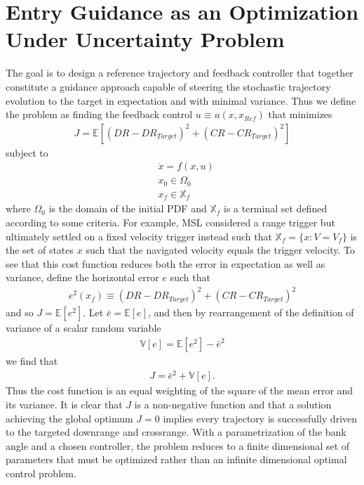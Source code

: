 \documentclass[10pt,a4paper]{article}
\begin{document}
	\section{Entry Guidance as an Optimization Under Uncertainty Problem}
	The goal is to design a reference trajectory and feedback controller that together constitute a guidance approach capable of steering the stochastic trajectory evolution to the target in expectation and with minimal variance. Thus we define the problem as finding the feedback control $u\equiv u(x,x_{Ref})$ that minimizes
	\begin{align}
		J = \mathbb{E}[(DR-DR_{Target})^2 + (CR-CR_{Target})^2]
	\end{align}
	subject to 
	\begin{align}
		&\dot{x} = f(x,u) \\
		&x_0 \in \Omega_0 \\
		&x_f \in \mathbb{ X}_f
	\end{align}
	where $\Omega_0$ is the domain of the initial PDF and $\mathbb{ X}_f$ is a terminal set defined according to some criteria. For example, MSL considered a range trigger \cite{RangeTriggerWay} but ultimately settled on a fixed velocity trigger instead such that $\mathbb{ X}_f = \{x: V=V_f \}$ is the set of states $x$ such that the navigated velocity equals the trigger velocity. To see that this cost function reduces both the error in expectation as well as variance, define the horizontal error $e$ such that
		\begin{align}
		e^2(x_f) \equiv (DR-DR_{Target})^2 + (CR-CR_{Target})^2
		\end{align}
	and so $	J = \mathbb{E}[e^2]$. Let $\bar{e} = \mathbb{E}[e]$, and then by rearrangement of the definition of variance of a scalar random variable
		\begin{align}
		\mathbb{V}[e] = \mathbb{E}[e^2] - \bar{e}^2
		\end{align}
	we find that 
		\begin{align}
		J = \bar{e}^2 + \mathbb{V}[e].
		\end{align}
	Thus the cost function is an equal weighting of the square of the mean error and its variance. It is clear that $ J $ is a non-negative function and that a solution achieving the global optimum $ J=0 $ implies every trajectory is successfully driven to the targeted downrange and crossrange. With a parametrization of the bank angle and a chosen controller, the problem reduces to a finite dimensional set of parameters that must be optimized rather than an infinite dimensional optimal control problem.
	
\end{document}
